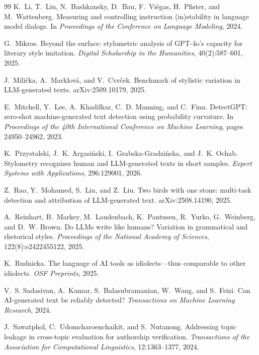 \documentclass[11pt]{article}
\begin{document}
\begin{thebibliography}{99}
K.~Li, T.~Liu, N.~Bashkansky, D.~Bau, F.~Vi\'egas, H.~Pfister, and
M.~Wattenberg.
\newblock Measuring and controlling instruction (in)stability in language
model dialogs.
\newblock In \emph{Proceedings of the Conference on Language Modeling}, 2024.

G.~Mikros.
\newblock Beyond the surface: stylometric analysis of GPT-4o's capacity for
literary style imitation.
\newblock \emph{Digital Scholarship in the Humanities}, 40(2):587--601, 2025.

J.~Mili\v{c}ka, A.~Marklov\'a, and V.~Cvr\v{c}ek.
\newblock Benchmark of stylistic variation in LLM-generated texts.
\newblock arXiv:2509.10179, 2025.

E.~Mitchell, Y.~Lee, A.~Khadilkar, C.~D. Manning, and C.~Finn.
\newblock DetectGPT: zero-shot machine-generated text detection using
probability curvature.
\newblock In \emph{Proceedings of the 40th International Conference on Machine
Learning}, pages 24950--24962, 2023.

K.~Przystalski, J.~K. Argasi\'nski, I.~Grabska-Gradzi\'nska, and J.~K. Ochab.
\newblock Stylometry recognizes human and LLM-generated texts in short
samples.
\newblock \emph{Expert Systems with Applications}, 296:129001, 2026.

Z.~Rao, Y.~Mohamed, S.~Liu, and Z.~Liu.
\newblock Two birds with one stone: multi-task detection and attribution of
LLM-generated text.
\newblock arXiv:2508.14190, 2025.

A.~Reinhart, B.~Markey, M.~Laudenbach, K.~Pantusen, R.~Yurko, G.~Weinberg,
and D.~W. Brown.
\newblock Do LLMs write like humans? Variation in grammatical and rhetorical
styles.
\newblock \emph{Proceedings of the National Academy of Sciences},
122(8):e2422455122, 2025.

K.~Rudnicka.
\newblock The language of AI tools as idiolects---thus comparable to other
idiolects.
\newblock \emph{OSF Preprints}, 2025.

V.~S. Sadasivan, A.~Kumar, S.~Balasubramanian, W.~Wang, and S.~Feizi.
\newblock Can AI-generated text be reliably detected?
\newblock \emph{Transactions on Machine Learning Research}, 2024.

J.~Sawatphol, C.~Udomcharoenchaikit, and S.~Nutanong.
\newblock Addressing topic leakage in cross-topic evaluation for authorship
verification.
\newblock \emph{Transactions of the Association for Computational
Linguistics}, 12:1363--1377, 2024.


\end{thebibliography}
\end{document}
